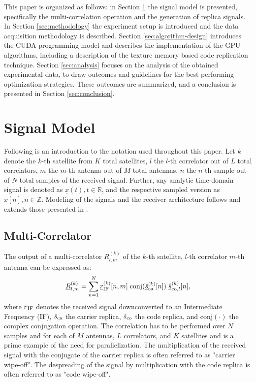 \documentclass{juliacon}
\begin{document}
This paper is organized as follows: in Section \ref{sec:signal-model} the signal model is presented, specifically the multi-correlation operation and the generation of replica signals. In Section \ref{sec:methodology} the experiment setup is introduced and the data acquisition methodology is described. Section \ref{sec:algorithm-design} introduces the CUDA programming model and describes the implementation of the GPU algorithms, including a description of the texture memory based code replication technique. Section \ref{sec:analysis} focuses on the analysis of the obtained experimental data, to draw outcomes and guidelines for the best performing optimization strategies. These outcomes are summarized, and a conclusion is presented in Section \ref{sec:conclusion}.

\section{Signal Model}\label{sec:signal-model}

Following is an introduction to the notation used throughout this paper. Let $k$ denote the $k$-th satellite from $K$ total satellites, $l$ the $l$-th correlator out of $L$ total correlators, $m$ the $m$-th antenna out of $M$ total antennas, $n$ the $n$-th sample out of $N$ total samples of the received signal. Further, any analytic time-domain signal is denoted as $\underline{x}(t), t \in \mathbb{R}$, and the respective sampled version as $\underline{x}[n], n \in \mathbb{Z}$. Modeling of the signals and the receiver architecture follows and extends those presented in \cite{Borre2007, Teunissen2017}.

\subsection*{Multi-Correlator}\label{sub:multi-correlator}
The output of a multi-correlator $R^{(k)}_{l,m}$ of the $k$-th satellite, $l$-th correlator $m$-th antenna can be expressed as:
\begin{equation}\label{eqn:multi-correlator}
    \underline{R}^{(k)}_{l,m} = \sum^N_{n=1} \underline{r}^{(k)}_{\mathrm{IF}}[n, m] \hspace{1mm} \mathrm{conj}(\underline{\hat{s}}^{(k)}_{\mathrm{ca}}[n]) \hspace{1mm} \underline{\hat{s}}_{\mathrm{co}, l}^{(k)}[n] ,
\end{equation}
where $r\textsubscript{IF}$ denotes the received signal downconverted to an Intermediate Frequency (IF), $\hat{s}\textsubscript{ca}$ the carrier replica, $\hat{s}\textsubscript{co}$ the code replica, and $\mathrm{conj}(\cdot)$ the complex conjugation operation. The correlation has to be performed over $N$ samples and for each of $M$ antennas, $L$ correlators, and $K$ satellites and is a prime example of the need for parallelization. The multiplication of the received signal with the conjugate of the carrier replica is often referred to as "carrier wipe-off". The despreading of the signal by multiplication with the code replica is often referred to as "code wipe-off".
\end{document}
